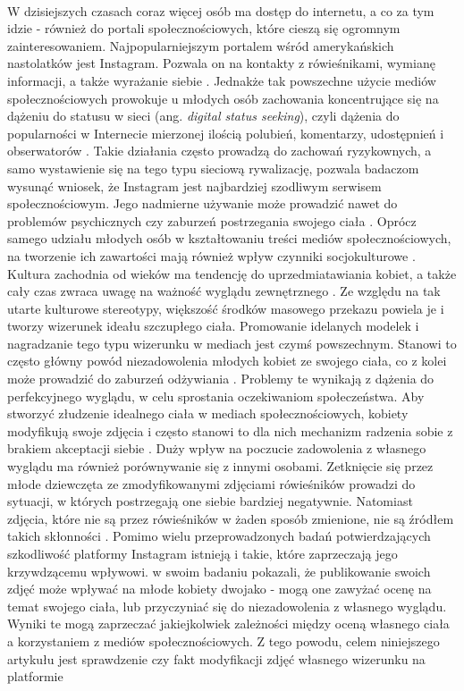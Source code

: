 \documentclass[12pt,a4paper,final,oneside,onecolumn,titlepage]{article}
\begin{document}
\paragraph{}
W dzisiejszych czasach coraz więcej osób ma dostęp do internetu, a co za tym idzie - również do portali społecznościowych, które cieszą się ogromnym zainteresowaniem. Najpopularniejszym portalem wśród amerykańskich nastolatków jest Instagram. Pozwala on na kontakty z rówieśnikami, wymianę informacji, a także wyrażanie siebie \citep{longobardi_follow_2020}. Jednakże tak powszechne użycie mediów społecznościowych prowokuje u młodych osób zachowania koncentrujące się na dążeniu do statusu w sieci (ang. \textit{digital status seeking}), czyli dążenia do popularności w Internecie mierzonej ilością polubień, komentarzy, udostępnień i obserwatorów \citep{nesi_search_2019}. Takie działania często prowadzą do zachowań ryzykownych, a samo wystawienie się na tego typu sieciową rywalizację, pozwala badaczom wysunąć wniosek, że Instagram jest najbardziej szodliwym serwisem społecznościowym. Jego nadmierne używanie może prowadzić nawet do problemów psychicznych czy zaburzeń postrzegania swojego ciała \citep{royal_society_for_public_health_status_2017}. Oprócz samego udziału młodych osób w kształtowaniu treści mediów społecznościowych, na tworzenie ich zawartości mają również wpływ czynniki socjokulturowe \citep{giorgianni_consumer_2020}. Kultura zachodnia od wieków ma tendencję do uprzedmiatawiania kobiet, a także cały czas zwraca uwagę na ważność wyglądu zewnętrznego \citep{lyu_travel_2016}. Ze względu na tak utarte kulturowe stereotypy, większość środków masowego przekazu powiela je i tworzy wizerunek ideału szczupłego ciała. Promowanie idelanych modelek i nagradzanie tego typu wizerunku w mediach jest czymś powszechnym. Stanowi to często główny powód niezadowolenia młodych kobiet ze swojego ciała, co z kolei może prowadzić do zaburzeń odżywiania \citep{grabe_role_2008}. Problemy te wynikają z dążenia do perfekcyjnego wyglądu, w celu sprostania oczekiwaniom społeczeństwa. Aby stworzyć złudzenie idealnego ciała w mediach społecznościowych, kobiety modyfikują swoje zdjęcia i często stanowi to dla nich mechanizm radzenia sobie z brakiem akceptacji siebie \citep{lyu_travel_2016}. Duży wpływ na poczucie zadowolenia z własnego wyglądu ma również porównywanie się z innymi osobami. Zetknięcie się przez młode dziewczęta ze zmodyfikowanymi zdjęciami rówieśników prowadzi do sytuacji, w których postrzegają one siebie bardziej negatywnie. Natomiast zdjęcia, które nie są przez rówieśników w żaden sposób zmienione, nie są źródłem takich skłonności \citep{kleemans_picture_2018}. Pomimo wielu przeprowadzonych badań potwierdzających szkodliwość platformy Instagram istnieją i takie, które zaprzeczają jego krzywdzącemu wpływowi. \citet{mclean_selfies_2015} w swoim badaniu pokazali, że publikowanie swoich zdjęć może wpływać na młode kobiety dwojako - mogą one zawyżać ocenę na temat swojego ciała, lub przyczyniać się do niezadowolenia z własnego wyglądu. Wyniki te mogą zaprzeczać jakiejkolwiek zależności między oceną własnego ciała a korzystaniem z mediów społecznościowych. Z tego powodu, celem niniejszego artykułu jest sprawdzenie czy fakt modyfikacji zdjęć własnego wizerunku na platformie 
\end{document}
